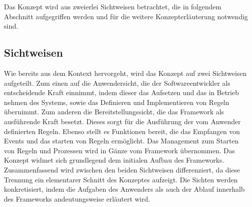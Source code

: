        Das Konzept wird aus zweierlei Sichtweisen betrachtet, die in folgendem Abschnitt aufgegriffen werden und für die weitere 
        Konzepterläuterung notwendig sind.
    
    \subsection{Sichtweisen}
    \label{subsec:sichtweisen}
        Wie bereits aus dem Kontext hervorgeht, wird das Konzept auf zwei Sichtweisen aufgeteilt. Zum einen auf die 
        Anwendersicht, die der Softwareentwickler als entscheidende Kraft einnimmt, indem dieser das Aufsetzen und das in 
        Betrieb nehmen des Systems, sowie das Definieren und Implementieren von Regeln übernimmt. Zum anderen die 
        Bereitstellungssicht, die das Framework als ausführende Kraft besetzt. Dieses sorgt für die Ausführung der vom 
        Anwender definierten Regeln. Ebenso stellt es Funktionen bereit, die das Empfangen von Events und das starten 
        von Regeln ermöglicht. Das Management zum Starten von Regeln und Prozessen wird in Gänze vom Framework übernommen. 
        Das Konzept widmet sich grundlegend dem initialen Aufbau des Frameworks. %
        \\
        \linebreak
        Zusammenfassend wird zwischen den beiden Sichtweisen differenziert, da diese Trennung ein elementarer Schnitt des Konzeptes 
        aufzeigt. Die Sichten werden konkretisiert, indem die Aufgaben des Anwenders als auch der Ablauf innerhalb des Frameworks 
        andeutungsweise erläutert wird.
        \\
        \linebreak
